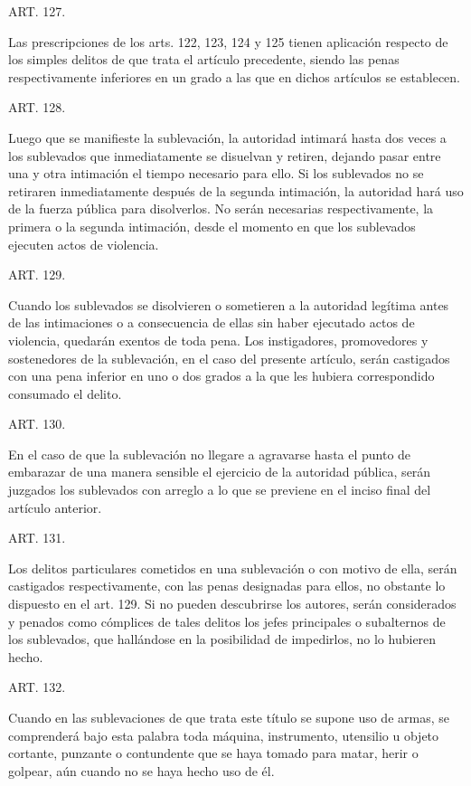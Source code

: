     ART. 127.

    Las prescripciones de los arts. 122, 123, 124 y 125 tienen aplicación respecto de los simples delitos de que trata el artículo precedente, siendo las penas respectivamente inferiores en un grado a las que en dichos artículos se establecen.


    ART. 128.

    Luego que se manifieste la sublevación, la autoridad intimará hasta dos veces a los sublevados que inmediatamente se disuelvan y retiren, dejando pasar entre una y otra intimación el tiempo necesario para ello.
    Si los sublevados no se retiraren inmediatamente después de la segunda intimación, la autoridad hará uso de la fuerza pública para disolverlos.
    No serán necesarias respectivamente, la primera o la segunda intimación, desde el momento en que los sublevados ejecuten actos de violencia.


    ART. 129.

    Cuando los sublevados se disolvieren o sometieren a la autoridad legítima antes de las intimaciones o a consecuencia de ellas sin haber ejecutado actos de violencia, quedarán exentos de toda pena.
    Los instigadores, promovedores y sostenedores de la sublevación, en el caso del presente artículo, serán castigados con una pena inferior en uno o dos grados a la que les hubiera correspondido consumado el delito.


    ART. 130.

    En el caso de que la sublevación no llegare a agravarse hasta el punto de embarazar de una manera sensible el ejercicio de la autoridad pública, serán juzgados los sublevados con arreglo a lo que se previene en el inciso final del artículo anterior.


    ART. 131.

    Los delitos particulares cometidos en una sublevación o con motivo de ella, serán castigados respectivamente, con las penas designadas para ellos, no obstante lo dispuesto en el art. 129.
    Si no pueden descubrirse los autores, serán considerados y penados como cómplices de tales delitos los jefes principales o subalternos de los sublevados, que hallándose en la posibilidad de impedirlos, no lo hubieren hecho.


    ART. 132.

    Cuando en las sublevaciones de que trata este título se supone uso de armas, se comprenderá bajo esta palabra toda máquina, instrumento, utensilio u objeto cortante, punzante o contundente que se haya tomado para matar, herir o golpear, aún cuando no se haya hecho uso de él.


